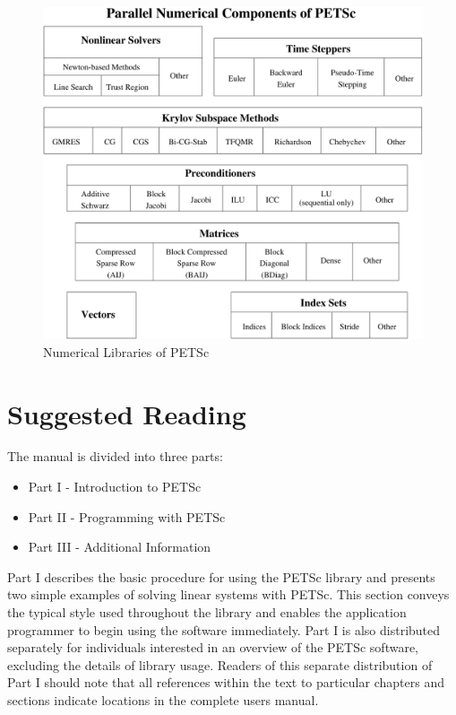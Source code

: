 \begin{figure}[hbt]
\centerline{ \includegraphics[scale=0.75]{zoom}}
\caption{Numerical Libraries of PETSc}
\label{fig_2}
\end{figure}

\section{Suggested Reading}

The manual is
divided into three parts:
\begin{itemize}
\item Part I - Introduction to PETSc
\item Part II - Programming with PETSc
\item Part III - Additional Information
\end{itemize}

Part I describes
the basic procedure for using the PETSc library and presents two
simple examples of solving linear systems with PETSc.  This section
conveys the typical style used throughout the library and enables the
application programmer to begin using the software immediately.
Part I is also distributed separately for individuals interested in an 
overview of the PETSc software, excluding the details of library usage.
Readers of this separate distribution of Part I should note that all
references within the text to particular chapters and sections 
indicate locations in the complete users manual.

